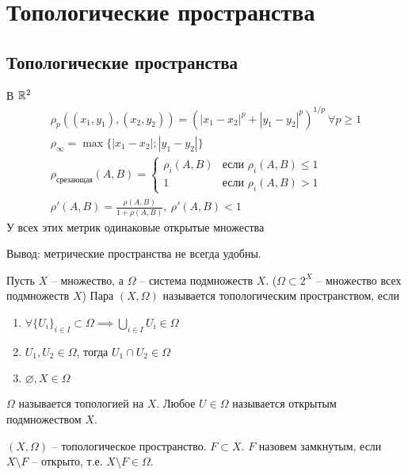 \documentclass[main]{subfiles}
\begin{document}
\chapter{Топологические пространства}
\section{Топологические пространства}
\begin{example}
    В $\mathbb{R}^2$
    \begin{gather*}
        \rho_p ((x_1,y_1), (x_2, y_2)) = (|x_1 -x_2|^p + |y_1 - y_2|^p)^{1/p}\ \forall p \ge 1\\
        \rho_\infty = \max\{|x_1-x_2|; |y_1-y_2|\}\\
        \rho_{\text{срезающая}}(A,B) = \begin{cases}
            \rho_i (A,B) & \text{если } \rho_i (A, B) \le 1 \\
            1            & \text{если }\rho_i (A, B) > 1
        \end{cases}\\
        \rho' (A,B) = \frac{\rho(A,B)}{1 + \rho(A,B)},\ \rho'(A,B) < 1
    \end{gather*}
    У всех этих метрик одинаковые открытые множества

    Вывод: метрические пространства не всегда удобны.
\end{example}

\begin{definition}
    Пусть $X$ -- множество, а $\Omega$ -- система подмножеств $X$.
    ($\Omega \subset 2^X$ -- множество всех подмножеств $X$)
    Пара $(X,\Omega)$ называется топологическим пространством, если
    \begin{enumerate}
        \item $\forall \{U_i\}_{i \in I} \subset \Omega \implies \bigcup_{i \in I} U_i \in \Omega$
        \item $U_1, U_2 \in \Omega$, тогда $U_1 \cap U_2 \in \Omega$
        \item $\varnothing, X \in \Omega$
    \end{enumerate}
\end{definition}

\begin{definition}
    $\Omega$ называется топологией на $X$.
    Любое $U \in \Omega$ называется открытым подмножеством $X$.
\end{definition}

\begin{definition}
    $(X, \Omega)$ -- топологическое пространство. $F \subset X$. $F$ назовем замкнутым,
    если $X \setminus F$ -- открыто, т.е. $X \setminus F \in \Omega$.
\end{definition}
\end{document}
